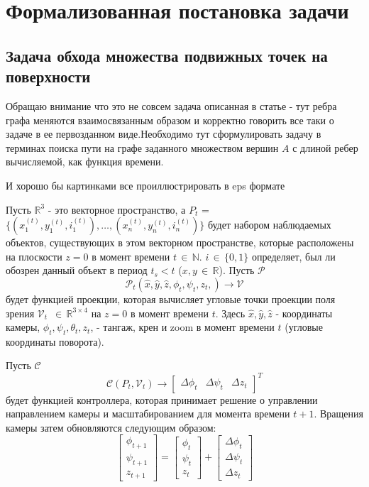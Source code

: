 \chapter{Формализованная постановка задачи}
\label{cha:Proposal}
  
 \section{Задача обхода множества подвижных точек на поверхности}

{\color{red} Обращаю внимание что это не совсем задача описанная в статье - тут ребра графа меняются взаимосвязанным образом и корректно говорить все таки о задаче в ее первозданном виде.Необходимо тут сформулировать задачу в терминах поиска пути на графе заданного множеством вершин $A$ с длиной ребер вычисляемой, как функция времени. 

И хорошо бы картинками все проиллюстрировать в eps формате}


Пусть $\mathbb{R}^{3}$ - это векторное пространство, а $P_{t}$ = $\{ (x_{1}^{(t)},y_{1}^{(t)}, i_1^{(t)}), \dots,(x_{n}^{(t)},y_{n}^{(t)},i_n^{(t)}) \}$ будет набором наблюдаемых объектов, существующих в этом векторном пространстве, которые расположены на плоскости $z=0$ в момент времени $t \, \in \, \mathbb{N}$. $i \, \in \, \{0,1\}$ определяет, был ли обозрен данный объект в период $t_s < t$ ($x,y \, \in \, \mathbb{R}$). Пусть $\mathcal{P}$
$$\mathcal{P}_{t}(\hat{x}, \hat{y}, \hat{z}, \phi_{t}, \psi_{t}, z_{t},) \to \mathcal{V}$$
будет функцией проекции, которая вычисляет угловые точки проекции поля зрения $\mathcal{V}_{t}$ $\, \in \, \mathbb{R}^{{3\times4}}$ на $z=0$ в момент времени $t$. Здесь $\hat{x}, \hat{y}, \hat{z}$ - координаты камеры, $\phi_{t}, \psi_{t}, \theta_{t}, z_t$,  - тангаж, крен и zoom в момент времени $t$ (угловые координаты поворота).

Пусть $\mathcal{C}$
$$
\mathcal{C}(P_{t}, \mathcal{V}_{t}) \to \begin{bmatrix}
\Delta\phi_{t}  &  \Delta\psi_{t}  &  \Delta z_t
\end{bmatrix}^{T}
$$
будет функцией контроллера, которая принимает решение о управлении направлением камеры и масштабированием для момента времени $t+1$. Вращения камеры затем обновляются следующим образом:
$$
\begin{bmatrix}
\phi_{t+1}   \\
 \psi_{t+1} \\
  z_{t+1} 
\end{bmatrix} = 
\begin{bmatrix}
\phi_{t}   \\
 \psi_{t} \\
  z_{t}
\end{bmatrix} + 
\begin{bmatrix}
\Delta\phi_{t}  \\
 \Delta\psi_{t}  \\
 \Delta z_{t}
\end{bmatrix}
$$

